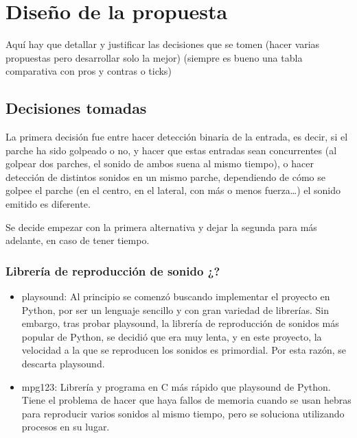 
\chapter{Diseño de la propuesta} %
\label{cha:Diseno}

    Aquí hay que detallar y justificar las decisiones que se tomen (hacer varias propuestas pero desarrollar solo la
    mejor) (siempre es bueno una tabla comparativa con pros y contras o ticks)

    \section{Decisiones tomadas} %
    \label{sec:DecisionesTomadas}

        La primera decisión fue entre hacer detección binaria de la entrada, es decir, si el parche ha sido golpeado o
        no, y hacer que estas entradas sean concurrentes (al golpear dos parches, el sonido de ambos suena al mismo
        tiempo), o hacer detección de distintos sonidos en un mismo parche, dependiendo de cómo se golpee el parche (en
        el centro, en el lateral, con más o menos fuerza…) el sonido emitido es diferente.\newline

        Se decide empezar con la primera alternativa y dejar la segunda para más adelante, en caso de tener tiempo.

        \subsection{Librería de reproducción de sonido ¿?} %
        \label{sub:LibreriaDeReproduccionDeSonido}

            \begin{itemize}
                \item
                playsound\cite{playsound}: Al principio se comenzó buscando implementar el proyecto en Python, por ser
                un lenguaje sencillo y con gran variedad de librerías. Sin embargo, tras probar playsound, la librería
                de reproducción de sonidos más popular de Python, se decidió que era muy lenta, y en este proyecto, la
                velocidad a la que se reproducen los sonidos es primordial. Por esta razón, se descarta playsound.
                \item
                mpg123\cite{mpg123}: Librería y programa en C más rápido que playsound de Python. Tiene el problema de
                hacer que haya fallos de memoria cuando se usan hebras para reproducir varios sonidos al mismo tiempo,
                pero se soluciona utilizando procesos en su lugar.
            \end{itemize}

